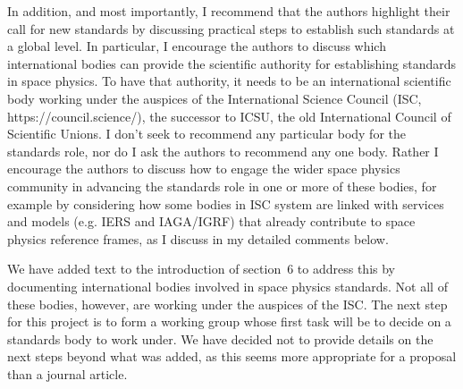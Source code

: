 \documentclass[11pt]{article}
\begin{document}
In addition, and most importantly, I recommend that the authors highlight their call for new standards by
discussing practical steps to establish such standards at a global level. In particular, I encourage the authors
to discuss which international bodies can provide the scientific authority for establishing standards in space
physics. To have that authority, it needs to be an international scientific body working under the auspices of
the International Science Council (ISC, https://council.science/), the successor to ICSU, the old International
Council of Scientific Unions. I don’t seek to recommend any particular body for the standards role, nor do I
ask the authors to recommend any one body. Rather I encourage the authors to discuss how to engage the
wider space physics community in advancing the standards role in one or more of these bodies, for example
by considering how some bodies in ISC system are linked with services and models (e.g. IERS and IAGA/IGRF)
that already contribute to space physics reference frames, as I discuss in my detailed comments below.
\\
{\color{violet}
\begin{leftbar}
We have added text to the introduction of section~6 to address this by documenting international bodies involved in space physics standards. Not all of these bodies, however, are working under the auspices of the ISC. The next step for this project is to form a working group whose first task will be to decide on a standards body to work under. We have decided not to provide details on the next steps beyond what was added, as this seems more appropriate for a proposal than a journal article.
\end{leftbar}
}
\end{document}
